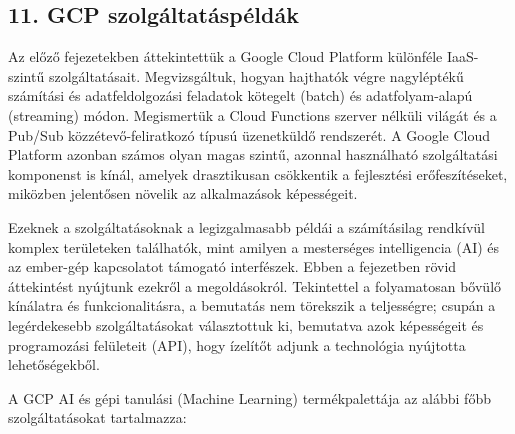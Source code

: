 \documentclass[
]{article}
\begin{document}
\hypertarget{gcp-szolguxe1ltatuxe1spuxe9lduxe1k}{%
\subsection{11. GCP
szolgáltatáspéldák}\label{gcp-szolguxe1ltatuxe1spuxe9lduxe1k}}

Az előző fejezetekben áttekintettük a Google Cloud Platform különféle
IaaS-szintű szolgáltatásait. Megvizsgáltuk, hogyan hajthatók végre
nagyléptékű számítási és adatfeldolgozási feladatok kötegelt (batch) és
adatfolyam-alapú (streaming) módon. Megismertük a Cloud Functions
szerver nélküli világát és a Pub/Sub közzétevő-feliratkozó típusú
üzenetküldő rendszerét. A Google Cloud Platform azonban számos olyan
magas szintű, azonnal használható szolgáltatási komponenst is kínál,
amelyek drasztikusan csökkentik a fejlesztési erőfeszítéseket, miközben
jelentősen növelik az alkalmazások képességeit.

Ezeknek a szolgáltatásoknak a legizgalmasabb példái a számításilag
rendkívül komplex területeken találhatók, mint amilyen a mesterséges
intelligencia (AI) és az ember-gép kapcsolatot támogató interfészek.
Ebben a fejezetben rövid áttekintést nyújtunk ezekről a megoldásokról.
Tekintettel a folyamatosan bővülő kínálatra és funkcionalitásra, a
bemutatás nem törekszik a teljességre; csupán a legérdekesebb
szolgáltatásokat választottuk ki, bemutatva azok képességeit és
programozási felületeit (API), hogy ízelítőt adjunk a technológia
nyújtotta lehetőségekből.

A GCP AI és gépi tanulási (Machine Learning) termékpalettája az alábbi
főbb szolgáltatásokat tartalmazza:
\end{document}

